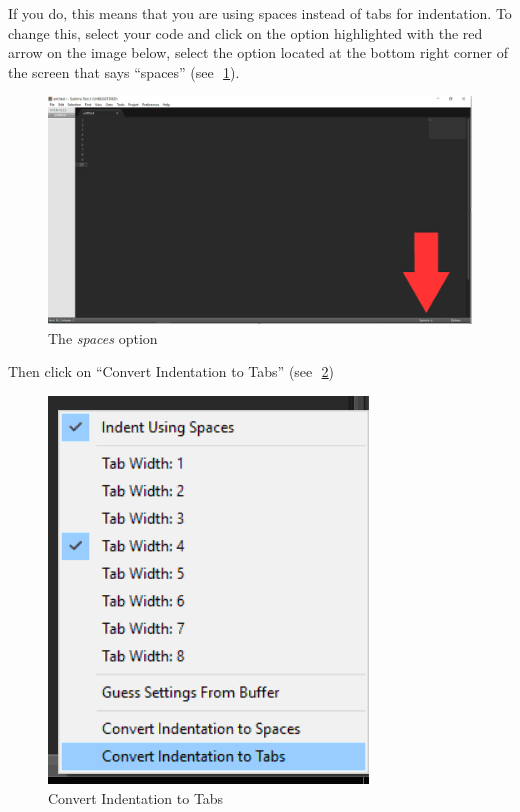 \documentclass{article}
\newenvironment{answer}{}{}
\newenvironment{faq}{\begin{description}}{\end{description}}
\begin{document}
\begin{faq}
\begin{answer}
			If you do, this means that you are using spaces instead of tabs for
			indentation. To change this, select your code and click on the option highlighted with
			the red arrow on the image below, select the option located at the bottom right corner
			of the screen that says ``spaces'' (see~\figurename\,\textcolor{blue}{\ref{The spaces option}}).
			
			\begin{figure}[htb]
				\centering
				\caption{The \emph{spaces} option} \label{The spaces option}
				\includegraphics[scale=.5]{spaces_option}
			\end{figure}
			
			Then click on ``Convert Indentation to Tabs'' (see~\figurename\,\textcolor{blue}{\ref{Convert Indentation to Tabs}})
			
			\begin{figure}[htb]
				\centering
				\caption{Convert Indentation to Tabs} \label{Convert Indentation to Tabs}
				\includegraphics[scale=.5]{indentation_to_tabs}
			\end{figure}
			

\end{answer}
\end{faq}
\end{document}

